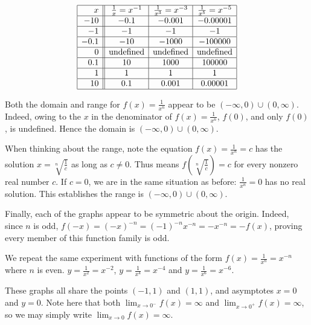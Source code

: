 \documentclass{ximera}
\begin{document}
\[\begin{array}{|r||c|c|c|}  \hline
x &  \frac{1}{x} = x^{-1} & \frac{1}{x^3} = x^{-3} & \frac{1}{x^5} = x^{-5} \\ \hline
 -10 & -0.1 &-0.001& -0.00001  \\  \hline
 -1 & -1 & -1&  -1\\  \hline
 -0.1 & -10 & -1000&  -100000 \\  \hline
 0 &  \text{undefined} &  \text{undefined}  &  \text{undefined}  \\  \hline
 0.1 & 10 & 1000&  100000 \\  \hline
 1 & 1 & 1&  1\\  \hline
 10 & 0.1 & 0.001& 0.00001  \\  \hline
\end{array}\]

Both the domain and range for $f(x) = \frac{1}{x^{n}}$ appear to be  $(-\infty, 0) \cup (0, \infty)$.  Indeed, owing to the $x$ in the denominator of $f(x) = \frac{1}{x^n}$, $f(0)$, and only $f(0)$,  is undefined. Hence the domain is $(-\infty, 0) \cup (0, \infty)$.  

When thinking about the range, note the equation  $f(x)= \frac{1}{x^n}  = c$ has the solution $x = \sqrt[n]{\frac{1}{c}}$ as long as $c \neq 0$.  Thus means $f\left( \sqrt[n]{\frac{1}{c}} \right) = c$ for every nonzero real number $c$.  If $c = 0$, we are in the same situation as before:  $\frac{1}{x^n} = 0$ has no real solution.  This establishes the range is $(-\infty, 0) \cup (0, \infty)$.  

Finally, each of the graphs appear to be symmetric about the origin.  Indeed, since $n$ is odd, $f(-x) = (-x)^{-n} = (-1)^{-n} x^{-n} = -x^{-n} = -f(x)$, proving every member of this function family is odd.  


We repeat the same experiment with functions of the form $f(x) = \frac{1}{x^{n}} = x^{-n}$ where $n$ is even. $y = \frac{1}{x^2} = x^{-2}$, $y = \frac{1}{x^4} = x^{-4}$ and $y = \frac{1}{x^6} = x^{-6}$.  


\begin{center} 
\end{center}

These graphs all share the points $(-1,1)$ and $(1,1)$, and asymptotes $x = 0$ and $y = 0$.  Note here that both $\lim_{x \rightarrow 0^{-}} f(x) = \infty$ and $\lim_{x \rightarrow 0^{+}} f(x) = \infty$, so we may simply write $\lim_{x \rightarrow 0} f(x) = \infty$. 
\end{document}

